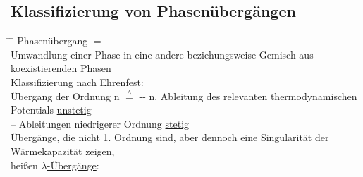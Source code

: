 \subsection{Klassifizierung von Phasenübergängen}
\begin{tabbing}
\hspace{4em} \= \hspace{4em} \= \kill
Phasenübergang $=$\\
\>Umwandlung einer Phase in eine andere beziehungsweise Gemisch aus koexistierenden Phasen\\
\underline{Klassifizierung nach Ehrenfest}:\\
Übergang der Ordnung n $\stackrel{\wedge}{=}$ \= -- n. Ableitung des relevanten thermodynamischen Potentials \underline{unstetig}\\
\> -- Ableitungen niedrigerer Ordnung \underline{stetig}\\
Übergänge, die nicht 1. Ordnung sind, aber dennoch eine Singularität der Wärmekapazität zeigen,\\ heißen \underline{$\lambda$-Übergänge}:
\end{tabbing}
\begin{figure}[H]
  \centering
\end{figure}
